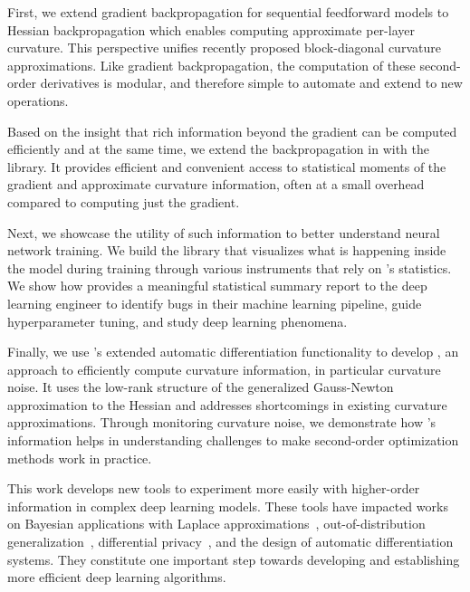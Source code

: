 First, we extend gradient backpropagation for sequential feedforward models to
Hessian backpropagation which enables computing approximate per-layer curvature.
This perspective unifies recently proposed block-diagonal curvature
approximations. Like gradient backpropagation, the computation of these
second-order derivatives is modular, and therefore simple to automate and extend
to new operations.

Based on the insight that rich information beyond the gradient can be computed
efficiently and at the same time, we extend the backpropagation in \pytorch with
the \backpack library. It provides efficient and convenient access to
statistical moments of the gradient and approximate curvature information, often
at a small overhead compared to computing just the gradient.

Next, we showcase the utility of such information to better understand neural
network training. We build the \cockpit library that visualizes what is
happening inside the model during training through various instruments that rely
on \backpack's statistics. We show how \cockpit provides a meaningful
statistical summary report to the deep learning engineer to identify bugs in
their machine learning pipeline, guide hyperparameter tuning, and study deep
learning phenomena.

Finally, we use \backpack's extended automatic differentiation functionality to
develop \vivit, an approach to efficiently compute curvature information, in
particular curvature noise. It uses the low-rank structure of the generalized
Gauss-Newton approximation to the Hessian and addresses shortcomings in existing
curvature approximations. Through monitoring curvature noise, we demonstrate how
\vivit's information helps in understanding challenges to make second-order
optimization methods work in practice.

This work develops new tools to experiment more easily with higher-order
information in complex deep learning models. These tools have impacted works on
Bayesian applications with Laplace approximations~\cite{daxberger2021laplace},
out-of-distribution generalization~\cite{gulrajani2021in,rame2022fishr},
differential privacy~\cite{yousefpour2021opacus}, and the design of automatic
differentiation systems. They constitute one important step towards developing
and establishing more efficient deep learning algorithms.


